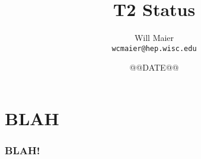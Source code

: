 \documentclass{beamer}
\title{T2 Status}
\author[Will Maier]{Will Maier \\ \texttt{wcmaier@hep.wisc.edu}}
\institute[Wisconsin]{University of Wisconsin - High Energy Physics}
\date{@@DATE@@}
\begin{document}


\section{BLAH}
\begin{frame}
    \frametitle{BLAH!}
\end{frame}
\end{document}
